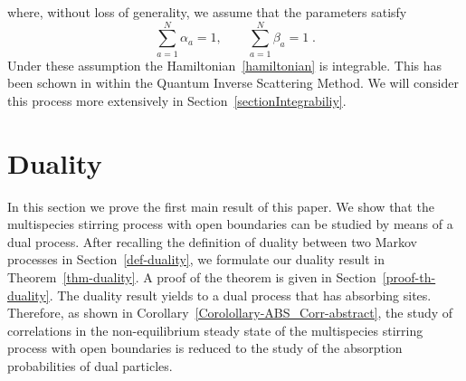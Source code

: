 \documentclass[10pt]{article}
\numberwithin{equation}{section}
\numberwithin{equation}{subsection}
\begin{document}
where, without loss of generality,  we assume that the parameters satisfy
\begin{equation}\label{ratesConditions}
	\sum_{a=1}^{N}\alpha_{a}=1,\qquad\sum_{a=1}^{N}\beta_{a}=1\;.
\end{equation} 
Under these assumption the Hamiltonian~\ref{hamiltonian} is integrable. This has been schown in \cite{vanicat2017exact} within  the Quantum Inverse Scattering Method.  We will consider this process more extensively in Section~\ref{sectionIntegrabiliy}.

\section{Duality}\label{sectionDuality}
In this section we prove the first main result of this paper. We show that the multispecies stirring process with open boundaries
can be studied by means of a dual process. After recalling the definition of duality between two
Markov processes in Section~\ref{def-duality}, we formulate our duality result  in Theorem~\ref{thm-duality}. A proof of the theorem is given in Section~\ref{proof-th-duality}.
The duality result yields {\color{blue} to a dual process that} %
 has absorbing sites. Therefore, as shown in Corollary~\ref{Corolollary-ABS_Corr-abstract}, the study of correlations in the non-equilibrium steady state of the multispecies stirring process with open boundaries
is reduced to the study of the absorption probabilities of dual particles.
\end{document}

